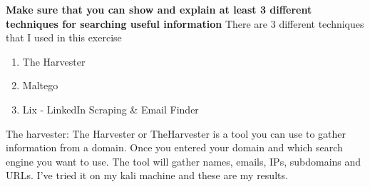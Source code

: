 \documentclass[12pt, letterpaper]{article}
\begin{document}
\hfill\break
\hfill\break
\textbf{ Make sure that you can show and explain at least 3 different techniques for searching useful information}
\hfill\break
\hfill\break
There are 3 different techniques that I used in this exercise
\begin{enumerate}
    \item The Harvester
    \item Maltego
    \item Lix - LinkedIn Scraping \& Email Finder
\end{enumerate}
\hfill\break
\hfill\break
The harvester:
\hfill\break
\hfill\break
\newpage
The Harvester or TheHarvester is a tool you can use to gather information from a domain. Once you entered your domain and which search engine you want to use. The tool will gather names, emails, IPs, subdomains and URLs.
\hfill\break
\hfill\break
I've tried it on my kali machine and these are my results.
\end{document}

